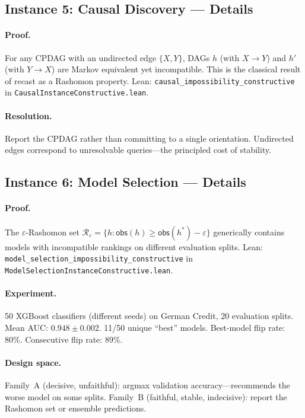 \documentclass{article}
\begin{document}
\subsection{Instance 5: Causal Discovery --- Details}

\paragraph{Proof.}
For any CPDAG with an undirected edge $\{X,Y\}$, DAGs $h$ (with $X \to Y$) and $h'$ (with $Y \to X$) are Markov equivalent yet incompatible.  This is the classical result of \citet{verma1991equivalence} recast as a Rashomon property.  Lean: \texttt{causal\_impossibility\_constructive} in \texttt{CausalInstanceConstructive.lean}.

\paragraph{Resolution.}
Report the CPDAG rather than committing to a single orientation.  Undirected edges correspond to unresolvable queries---the principled cost of stability.

\subsection{Instance 6: Model Selection --- Details}

\paragraph{Proof.}
The $\varepsilon$-Rashomon set $\mathcal{R}_\varepsilon = \{h : \mathsf{obs}(h) \geq \mathsf{obs}(h^*) - \varepsilon\}$ generically contains models with incompatible rankings on different evaluation splits.  Lean: \texttt{model\_selection\_impossibility\_constructive} in \texttt{ModelSelectionInstanceConstructive.lean}.

\paragraph{Experiment.}
50 XGBoost classifiers (different seeds) on German Credit, 20 evaluation splits.  Mean AUC: $0.948 \pm 0.002$.  11/50 unique ``best'' models.  Best-model flip rate: 80\%.  Consecutive flip rate: 89\%.

\paragraph{Design space.}
Family~A (decisive, unfaithful): argmax validation accuracy---recommends the worse model on some splits.
Family~B (faithful, stable, indecisive): report the Rashomon set or ensemble predictions.
\end{document}
